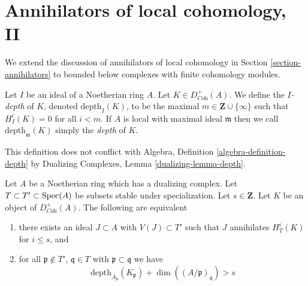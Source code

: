\section{Annihilators of local cohomology, II}
\label{section-annihilators-II}

\noindent
We extend the discussion of annihilators of local cohomology in
Section \ref{section-annihilators}
to bounded below complexes with finite cohomology modules.

\begin{definition}
\label{definition-depth-complex}
Let $I$ be an ideal of a Noetherian ring $A$. Let
$K \in D^+_{\textit{Coh}}(A)$. We define the {\it $I$-depth} of $K$,
denoted $\text{depth}_I(K)$, to be the maximal
$m \in \mathbf{Z} \cup \{\infty\}$ such that $H^i_I(K) = 0$ for all $i < m$.
If $A$ is local with maximal ideal $\mathfrak m$
then we call $\text{depth}_\mathfrak m(K)$ simply the {\it depth} of $K$.
\end{definition}

\noindent
This definition does not conflict with
Algebra, Definition \ref{algebra-definition-depth}
by Dualizing Complexes, Lemma \ref{dualizing-lemma-depth}.

\begin{proposition}
\label{proposition-annihilator-complex}
Let $A$ be a Noetherian ring which has a dualizing complex.
Let $T \subset T' \subset \mathop{\mathrm{Spec}}(A)$ be subsets stable under
specialization. Let $s \in \mathbf{Z}$. Let $K$ be an object of
$D_{\textit{Coh}}^+(A)$. The following are equivalent
\begin{enumerate}
\item there exists an ideal $J \subset A$ with $V(J) \subset T'$
such that $J$ annihilates $H^i_T(K)$ for $i \leq s$, and
\item for all $\mathfrak p \not \in T'$,
$\mathfrak q \in T$ with $\mathfrak p \subset \mathfrak q$
we have
$$
\text{depth}_{A_\mathfrak p}(K_\mathfrak p) +
\dim((A/\mathfrak p)_\mathfrak q) > s
$$
\end{enumerate}
\end{proposition}

